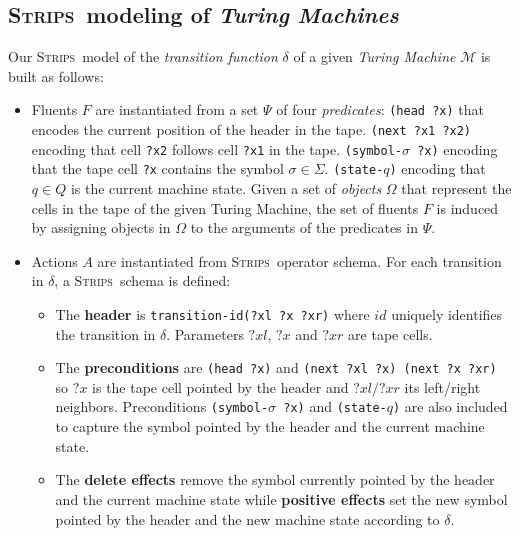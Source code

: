 \documentclass[letterpaper]{article} %
\newcommand{\strips}{\textsc{Strips}}     %
\begin{document}
\subsection{\strips\ modeling of {\em Turing Machines}}
Our \strips\ model of the {\em transition function} $\delta$ of a given {\em Turing Machine} $\mathcal{M}$ is built as follows:
\begin{itemize}
\item Fluents $F$ are instantiated from a set $\Psi$ of four {\em predicates}: {\small\tt (head ?x)} that encodes the current position of the header in the tape. {\small\tt (next ?x1 ?x2)} encoding that cell {\tt ?x2} follows cell {\tt ?x1} in the tape. {\small\tt (symbol-$\sigma$ ?x)} encoding that the tape cell {\tt ?x} contains the symbol $\sigma\in\Sigma$. {\small\tt (state-$q$)} encoding that $q\in Q$ is the current machine state. Given a set of {\em objects} $\Omega$ that represent the cells in the tape of the given Turing Machine, the set of fluents $F$ is induced by assigning objects in $\Omega$ to the arguments of the predicates in $\Psi$.
\item Actions $A$ are instantiated from \strips\ operator schema. For each transition in $\delta$, a \strips\ schema is defined:
\begin{itemize}
\item The {\bf header} is {\small\tt transition-id(?xl ?x ?xr)} where $id$ uniquely identifies the transition in $\delta$. Parameters $?xl$, $?x$ and $?xr$ are tape cells.
\item The {\bf preconditions} are {\small\tt(head ?x)} and {\small\tt (next ?xl ?x) (next ?x ?xr)} so $?x$ is the tape cell pointed by the header and $?xl/?xr$ its left/right neighbors. Preconditions {\small\tt(symbol-$\sigma$ ?x)} and {\small\tt (state-$q$)} are also included to capture the symbol pointed by the header and the current machine state.
\item The {\bf delete effects} remove the symbol currently pointed by the header and the current machine state while {\bf positive effects} set the new symbol pointed by the header and the new machine state according to $\delta$.
\end{itemize}
\end{itemize}
\end{document}
